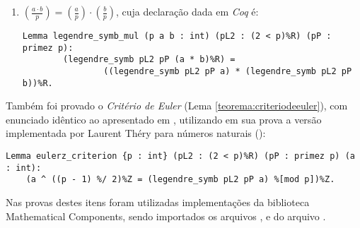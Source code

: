 \begin{enumerate}

        
        \item $\left(\frac{a \cdot b}{p}\right) = \left(\frac{a}{p}\right) \cdot \left(\frac{b}{p}\right)$, cuja declaração dada em \textit{Coq} é:
        \newline
                \begin{lstlisting}[language=coq,frame=single,tabsize=1]
Lemma legendre_symb_mul (p a b : int) (pL2 : (2 < p)%R) (pP : primez p):
        (legendre_symb pL2 pP (a * b)%R) = 
                ((legendre_symb pL2 pP a) * (legendre_symb pL2 pP b))%R.
                \end{lstlisting}
        \end{enumerate}
        Também foi provado o \textit{Critério de Euler} (Lema \ref{teorema:criteriodeeuler}), com enunciado idêntico ao apresentado em \cite[p.~87]{book:2399854}, utilizando em sua prova a versão implementada por Laurent Théry para números naturais ():
        \begin{lstlisting}[language=coq,frame=single,tabsize=1]
Lemma eulerz_criterion {p : int} (pL2 : (2 < p)%R) (pP : primez p) (a : int):
    (a ^ ((p - 1) %/ 2)%Z = (legendre_symb pL2 pP a) %[mod p])%Z.
        \end{lstlisting}

        Nas provas destes itens foram utilizadas implementações da biblioteca Mathematical Components, sendo importados os arquivos \cite{mathcomp-allssreflect}, \cite{mathcomp-allalgebra} e  do arquivo \cite{mathcomp-extra-euler}.
        
